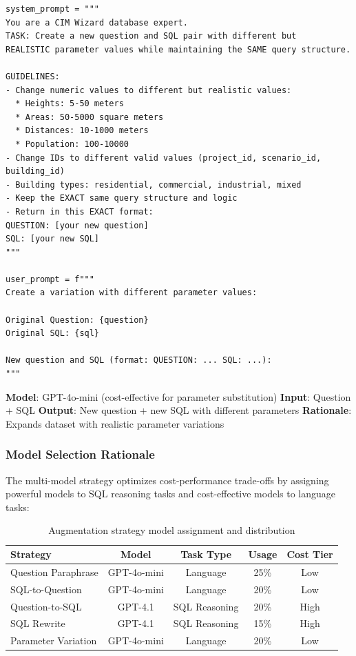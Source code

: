 \begin{lstlisting}[style=pythonstyle, caption=Parameter variation strategy]
system_prompt = """
You are a CIM Wizard database expert.
TASK: Create a new question and SQL pair with different but 
REALISTIC parameter values while maintaining the SAME query structure.

GUIDELINES:
- Change numeric values to different but realistic values:
  * Heights: 5-50 meters
  * Areas: 50-5000 square meters
  * Distances: 10-1000 meters
  * Population: 100-10000
- Change IDs to different valid values (project_id, scenario_id, building_id)
- Building types: residential, commercial, industrial, mixed
- Keep the EXACT same query structure and logic
- Return in this EXACT format:
QUESTION: [your new question]
SQL: [your new SQL]
"""

user_prompt = f"""
Create a variation with different parameter values:

Original Question: {question}
Original SQL: {sql}

New question and SQL (format: QUESTION: ... SQL: ...):
"""
\end{lstlisting}

\textbf{Model}: GPT-4o-mini (cost-effective for parameter substitution)
\textbf{Input}: Question + SQL
\textbf{Output}: New question + new SQL with different parameters
\textbf{Rationale}: Expands dataset with realistic parameter variations

\subsubsection{Model Selection Rationale}

The multi-model strategy optimizes cost-performance trade-offs by assigning powerful models to SQL reasoning tasks and cost-effective models to language tasks:

\begin{table}%
\centering
\small
\begin{tabular}{lcccc}
\toprule
\textbf{Strategy} & \textbf{Model} & \textbf{Task Type} & \textbf{Usage} & \textbf{Cost Tier} \\
\midrule
Question Paraphrase & GPT-4o-mini & Language & 25\% & Low \\
SQL-to-Question & GPT-4o-mini & Language & 20\% & Low \\
Question-to-SQL & GPT-4.1 & SQL Reasoning & 20\% & High \\
SQL Rewrite & GPT-4.1 & SQL Reasoning & 15\% & High \\
Parameter Variation & GPT-4o-mini & Language & 20\% & Low \\
\bottomrule
\end{tabular}
\caption{Augmentation strategy model assignment and distribution}
\end{table}

